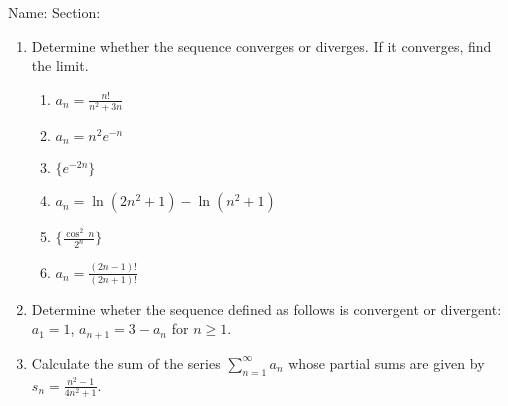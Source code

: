 \documentclass[12pt]{article}
\begin{document}
\noindent Name: \hspace{4in}Section:
\vspace{0.5cm}



\begin{enumerate}
\item Determine whether the sequence converges or diverges. If it converges, find the limit.
\begin{enumerate}
\item $a_n=\frac{n!}{n^2+3n}$
\vfill

\item $a_n= n^2e^{-n}$
\vfill
\item $\{e^{-2n}\}$
\vfill
\item $a_n= \ln(2n^2+1)- \ln(n^2+1)$
\vfill



\newpage

\item $\{\frac{\cos^2\: n}{2^n}\}$
\vfill

\item $a_n=\frac{(2n-1)!}{(2n+1)!}$

\vfill

\end{enumerate}
\item Determine wheter the sequence defined as follows is convergent or divergent: $a_1=1$, $a_{n+1}=3-a_n$ for $n\geq    1$.
\vfill
\item Calculate the sum of the series $\sum_{n=1}^{\infty} a_n$ whose partial sums are given by $s_n=\frac{n^2-1}{4n^2+1}$.
 

\vfill



\end{enumerate}
\end{document}
